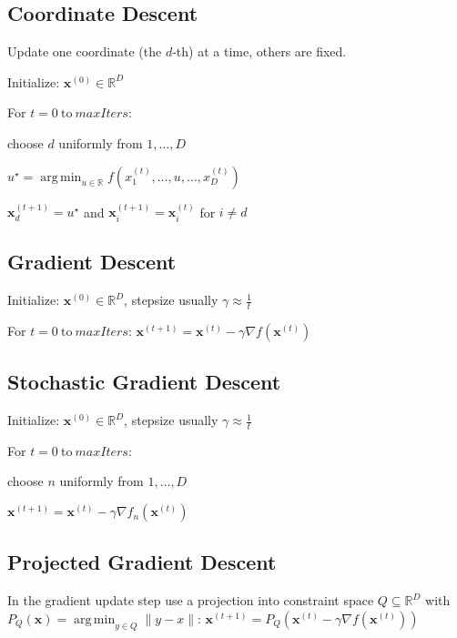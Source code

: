 \documentclass[a4paper, 11pt, landscape]{article}
\DeclareMathOperator*{\argmin}{arg\,min}
\begin{document}
\begin{multicols*}{3}
\subsection{Coordinate Descent}
Update one coordinate (the $d$-th) at a time, others are fixed.
\begin{inparaenum}
	\item Initialize: $\mathbf{x}^{(0)} \in \mathbb{R}^D$
	\item For $t = 0 \ \text{to} \ \mathit{maxIters}$:
	\item choose $d$ uniformly from $1, \ldots, D$
	\item $u^\star = \argmin_{u \in \mathbb{R}} f(x_1^{(t)}, \ldots, u, \ldots, x_D^{(t)})$
	\item $\mathbf{x}_d^{(t+1)} = u^\star$ and $\mathbf{x}_i^{(t+1)} = \mathbf{x}_i^{(t)}$ for $i \neq d$
\end{inparaenum}

\subsection{Gradient Descent}
\begin{inparaenum}
	\item Initialize: $\mathbf{x}^{(0)} \in \mathbb{R}^D$, stepsize usually $\gamma \approx \frac{1}{t}$
	\item For $t = 0 \ \text{to} \ \mathit{maxIters}$: $\mathbf{x}^{(t+1)} = \mathbf{x}^{(t)} - \gamma \nabla f(\mathbf{x}^{(t)})$
\end{inparaenum}

\subsection{Stochastic Gradient Descent}
\begin{inparaenum}
	\item Initialize: $\mathbf{x}^{(0)} \in \mathbb{R}^D$, stepsize usually $\gamma \approx \frac{1}{t}$
	\item For $t = 0 \ \text{to} \ \mathit{maxIters}$:
	\item choose $n$ uniformly from $1, \ldots, D$
	\item $\mathbf{x}^{(t+1)} = \mathbf{x}^{(t)} - \gamma \nabla f_n(\mathbf{x}^{(t)})$
\end{inparaenum}

\subsection{Projected Gradient Descent}
In the gradient update step use a projection into constraint space $Q \subseteq \mathbb{R}^D$ with $P_Q(\mathbf{x}) = \argmin_{y \in Q} \|y - x\|$: $\mathbf{x}^{(t+1)} = P_Q\left(\mathbf{x}^{(t)} - \gamma \nabla f(\mathbf{x}^{(t)})\right)$


\end{multicols*}
\end{document}
